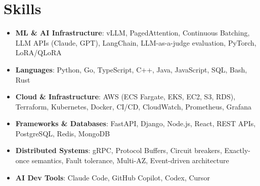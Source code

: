 \documentclass[letterpaper,11pt]{article}
\newcommand{\resumeSubHeadingListStart}{\begin{itemize}[leftmargin=0.15in, label={}]}
\newcommand{\resumeSubHeadingListEnd}{\end{itemize}}
\newcommand{\resumeSkillHeading}[2]{%
  \item\small{\textbf{#1}: #2 \vspace{-9pt}}%
}
\begin{document}
\section{Skills}
  \resumeSubHeadingListStart
    \resumeSkillHeading{ML \& AI Infrastructure}{vLLM, PagedAttention, Continuous Batching, LLM APIs (Claude, GPT), LangChain, LLM-as-a-judge evaluation, PyTorch, LoRA/QLoRA}
    \resumeSkillHeading{Languages}{Python, Go, TypeScript, C++, Java, JavaScript, SQL, Bash, Rust}
    \resumeSkillHeading{Cloud \& Infrastructure}{AWS (ECS Fargate, EKS, EC2, S3, RDS), Terraform, Kubernetes, Docker, CI/CD, CloudWatch, Prometheus, Grafana}
    \resumeSkillHeading{Frameworks \& Databases}{FastAPI, Django, Node.js, React, REST APIs, PostgreSQL, Redis, MongoDB}
    \resumeSkillHeading{Distributed Systems}{gRPC, Protocol Buffers, Circuit breakers, Exactly-once semantics, Fault tolerance, Multi-AZ, Event-driven architecture}
    \resumeSkillHeading{AI Dev Tools}{Claude Code, GitHub Copilot, Codex, Cursor}
  \resumeSubHeadingListEnd
\end{document}
